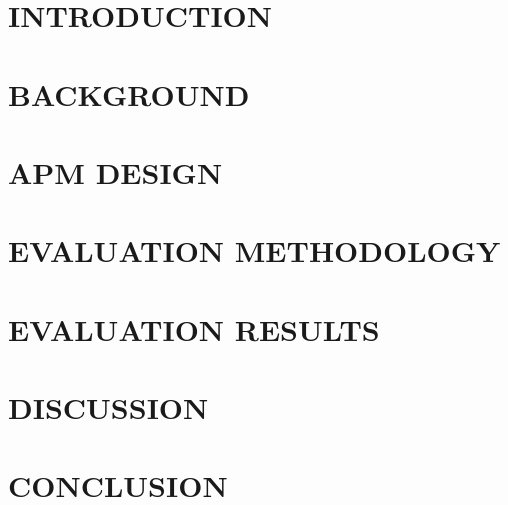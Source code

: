 \documentclass[ack]{apmthesis}
\begin{document}
\frontmatter

\mainmatter

\chapter{INTRODUCTION}


\chapter{BACKGROUND}
\label{chap:background}


\chapter{APM DESIGN}
\label{chap:framework-design}


\chapter{EVALUATION METHODOLOGY}
\label{chap:evaluation-methodology}


\chapter{EVALUATION RESULTS}
\label{chap:evaluation-results}


\chapter{DISCUSSION}
\label{chap:discussion}


\chapter{CONCLUSION}
\label{chap:conclusion}


\backmatter

\abbreviations
\end{document}
